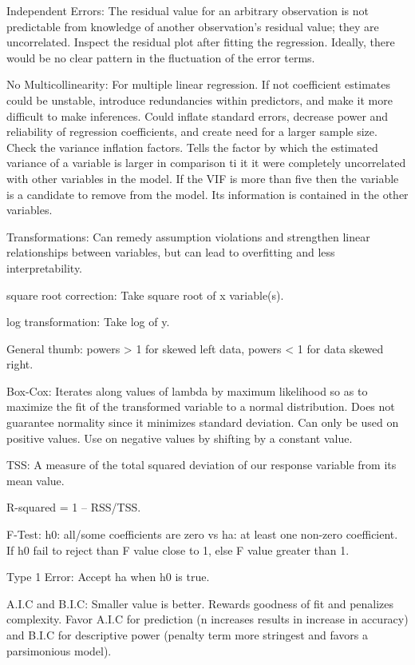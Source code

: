 \documentclass[]{book}
\theoremstyle{definition}
\theoremstyle{definition}
\theoremstyle{definition}
\theoremstyle{remark}
\begin{document}
Independent Errors: The residual value for an arbitrary observation is
not predictable from knowledge of another observation's residual value;
they are uncorrelated. Inspect the residual plot after fitting the
regression. Ideally, there would be no clear pattern in the fluctuation
of the error terms.

No Multicollinearity: For multiple linear regression. If not coefficient
estimates could be unstable, introduce redundancies within predictors,
and make it more difficult to make inferences. Could inflate standard
errors, decrease power and reliability of regression coefficients, and
create need for a larger sample size. Check the variance inflation
factors. Tells the factor by which the estimated variance of a variable
is larger in comparison ti it it were completely uncorrelated with other
variables in the model. If the VIF is more than five then the variable
is a candidate to remove from the model. Its information is contained in
the other variables.

Transformations: Can remedy assumption violations and strengthen linear
relationships between variables, but can lead to overfitting and less
interpretability.

square root correction: Take square root of x variable(s).

log transformation: Take log of y.

General thumb: powers \textgreater{} 1 for skewed left data, powers
\textless{} 1 for data skewed right.

Box-Cox: Iterates along values of lambda by maximum likelihood so as to
maximize the fit of the transformed variable to a normal distribution.
Does not guarantee normality since it minimizes standard deviation. Can
only be used on positive values. Use on negative values by shifting by a
constant value.

TSS: A measure of the total squared deviation of our response variable
from its mean value.

R-squared = 1 -- RSS/TSS.

F-Test: h0: all/some coefficients are zero vs ha: at least one non-zero
coefficient. If h0 fail to reject than F value close to 1, else F value
greater than 1.

Type 1 Error: Accept ha when h0 is true.

A.I.C and B.I.C: Smaller value is better. Rewards goodness of fit and
penalizes complexity. Favor A.I.C for prediction (n increases results in
increase in accuracy) and B.I.C for descriptive power (penalty term more
stringest and favors a parsimonious model).
\end{document}
